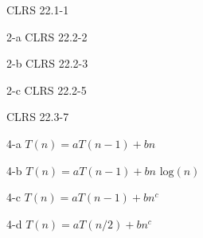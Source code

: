 \documentclass[11pt]{article}
\newcommand{\tlog}{\text{ log}}
\begin{document}
\begin{prob}{1}
CLRS 22.1-1 
\end{prob}
\begin{sol} 


\end{sol}

\begin{prob}{2-a}
CLRS 22.2-2
\end{prob}
\begin{sol} 


\end{sol}

\begin{prob}{2-b}
CLRS 22.2-3 
\end{prob}
\begin{sol} 


\end{sol}

\begin{prob}{2-c}
CLRS 22.2-5 
\end{prob}
\begin{sol} 


\end{sol}

\begin{prob}{3}
CLRS 22.3-7
\end{prob}
\begin{sol} 


\end{sol}

\begin{prob}{4-a}
$T(n) = aT(n-1) + bn$
\end{prob}
\begin{sol} 


\end{sol}

\begin{prob}{4-b}
$T(n) = aT(n-1) + bn\tlog(n)$
\end{prob}
\begin{sol} 


\end{sol}

\begin{prob}{4-c}
$T(n) = aT(n-1) + bn^{c}$
\end{prob}
\begin{sol} 


\end{sol}

\begin{prob}{4-d}
$T(n) = aT(n/2) + bn^{c}$
\end{prob}
\begin{sol} 


\end{sol}

\end{document}

